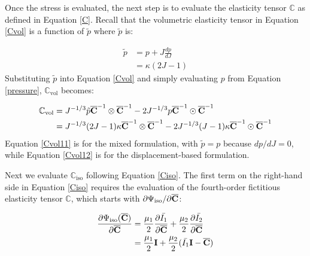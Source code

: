 Once the stress is evaluated, the next step is to evaluate the elasticity tensor $\mathbb{C}$ as defined in Equation \ref{C}. Recall that the volumetric elasticity tensor in Equation \ref{Cvol} is a function of $\tilde{p}$ where $\tilde{p}$ is:

\begin{equation}
\begin{split}
\tilde{p} &= p + J\frac{dp}{dJ} \\
             &= \kappa{(2J - 1)}
\end{split}
\end{equation}
Substituting $\tilde{p}$ into Equation \ref{Cvol} and simply evaluating $p$ from Equation \ref{pressure}, $\mathbb{C}_\mathrm{vol}$ becomes:

\begin{subequations} \label{Cvol1}
\begin{align}
\mathbb{C}_\mathrm{vol} &= J^{-1/3}\tilde{p}{\overline{\bold{C}}}^{-1}\otimes{\overline{\bold{C}}}^{-1} - 2J^{-1/3}p{\overline{\bold{C}}}^{-1}\odot{\overline{\bold{C}}}^{-1} \label{Cvol11} \\
&=  J^{-1/3}(2J-1)\kappa \overline{\bold{C}}^{-1} \otimes \overline{\bold{C}}^{-1} - 2J^{-1/3}(J-1)\kappa \overline{\bold{C}}^{-1} \odot \overline{\bold{C}}^{-1} \label{Cvol12}
\end{align}
\end{subequations} 
Equation \ref{Cvol11} is for the mixed formulation, with $\tilde{p} = p$ because $dp/dJ = 0$, while Equation \ref{Cvol12} is for the displacement-based formulation.

Next we evaluate $\mathbb{C}_\mathrm{iso}$ following Equation \ref{Ciso}. The first term on the right-hand side in Equation \ref{Ciso} requires the evaluation of the fourth-order fictitious elasticity tensor $\mathbb{C}$, which starts with ${\partial{\Psi_\mathrm{iso}}}/{\partial{\overline{\bold{C}}}}$:

\begin{equation}
\begin{split}
\frac{\partial{\Psi_\mathrm{iso}(\overline{\bold{C}})}}{\partial{\overline{\bold{C}}}} &= \frac{\mu_1}{2}\frac{\partial{\bar{I_1}}}{\partial{\overline{\bold{C}}}} +  \frac{\mu_2}{2}\frac{\partial{\bar{I_2}}}{\partial{\overline{\bold{C}}}} \\
&= \frac{\mu_1}{2}\bold{I} + \frac{\mu_2}{2}(\bar{I_1}\bold{I} - \overline{\bold{C}})
\end{split}
\end{equation}

